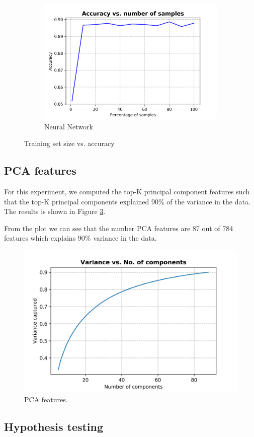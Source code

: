 \documentclass[10pt]{scrartcl}
\begin{document}
\begin{figure}[H]
\begin{subfigure}{0.4\linewidth}
		\includegraphics[width=1\linewidth]{figures/accuracy_vs_samples_neural_net_tuned.png}
		\caption{Neural Network}\label{fig:1b}
	\end{subfigure}
	\caption{Training set size vs. accuracy}\label{fig:1}
\end{figure}

\subsection*{PCA features}
For this experiment, we computed the top-K principal component features such that the top-K principal components explained 90\% of the variance in the data. 
The results is shown in Figure \ref{fig:pca_features}.

From the plot we can see that the number PCA features are 87 out of 784 features which explains 90\% variance in the data.
\begin{figure}[H]
\centering
\includegraphics[width=0.5\linewidth]{figures/pca_variance_vs_no_comp.png}
\caption{PCA features. \label{fig:pca_features}}
\end{figure}

\subsection*{Hypothesis testing}
\end{document}
